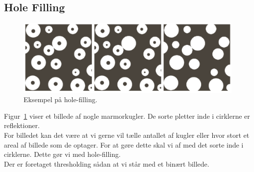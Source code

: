 \subsection{Hole Filling}

\begin{figure}[H]
	\centering
	\includegraphics[width=\linewidth]{figs/spm10/hole-filling}
	\caption{Eksempel på hole-filling.}
	\label{fig:hole-filling}
\end{figure}

Figur~\ref{fig:hole-filling} viser et billede af nogle marmorkugler. De sorte pletter inde i cirklerne er reflektioner.\\

For billedet kan det være at vi gerne vil tælle antallet af kugler eller hvor stort et areal af billede som de optager. For at gøre dette skal vi af med det sorte inde i cirklerne. Dette gør vi med hole-filling.\\

Der er foretaget thresholding sådan at vi står med et binært billede.\\
